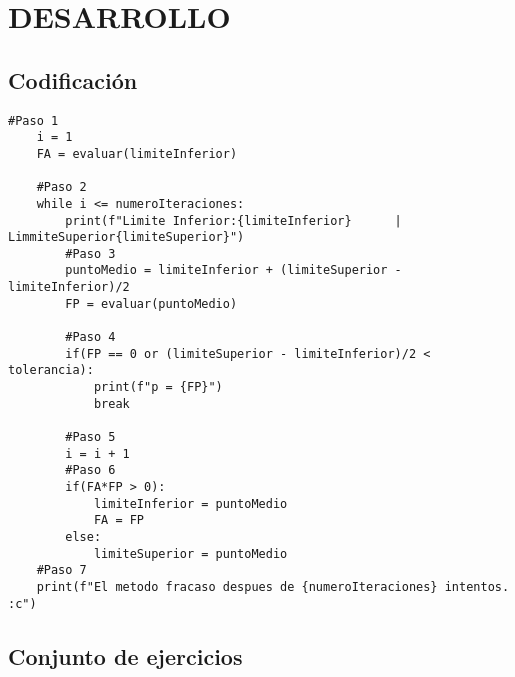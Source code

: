 \documentclass[12pt]{article}
\begin{document}
\vspace{0.5cm}

\section*{DESARROLLO}
\subsection*{Codificación}


\begin{lstlisting}[caption={Algoritmo de Bisección en Python}, label={lst:codigo-experimento}]
    #Paso 1
    i = 1
    FA = evaluar(limiteInferior)
    
    #Paso 2
    while i <= numeroIteraciones:
        print(f"Limite Inferior:{limiteInferior}      |    LimmiteSuperior{limiteSuperior}")
        #Paso 3
        puntoMedio = limiteInferior + (limiteSuperior - limiteInferior)/2
        FP = evaluar(puntoMedio)
        
        #Paso 4
        if(FP == 0 or (limiteSuperior - limiteInferior)/2 < tolerancia):
            print(f"p = {FP}")
            break
    
        #Paso 5
        i = i + 1
        #Paso 6
        if(FA*FP > 0):
            limiteInferior = puntoMedio
            FA = FP
        else:
            limiteSuperior = puntoMedio
    #Paso 7
    print(f"El metodo fracaso despues de {numeroIteraciones} intentos. :c")
\end{lstlisting}
    
    

\subsection*{Conjunto de ejercicios}
\end{document}
